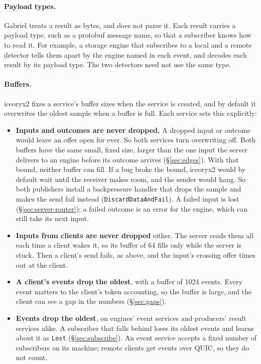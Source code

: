 \documentclass[11pt]{article}
\newcommand{\code}[1]{\texttt{#1}}
\begin{document}
\paragraph{Payload types.} Gabriel treats a result as bytes, and does not
parse it. Each result carries a payload type, such as a protobuf message name,
so that a subscriber knows how to read it. For example, a storage engine that
subscribes to a local and a remote detector tells them apart by the engine
named in each event, and decodes each result by its payload type. The two
detectors need not use the same type.

\paragraph{Buffers.} iceoryx2 fixes a service's buffer sizes when the service
is created, and by default it overwrites the oldest sample when a buffer is
full. Each service sets this explicitly:
\begin{itemize}[nosep]
  \item \textbf{Inputs and outcomes are never dropped.} A dropped input or
        outcome would leave an offer open for ever. So both services turn
        overwriting off. Both buffers have the same small, fixed size, larger
        than the one input the server delivers to an engine before its
        outcome arrives (\S\ref{sec:edges}). With that bound, neither buffer
        can fill. If a bug broke the bound, iceoryx2 would by default wait
        until the receiver makes room, and the sender would hang. So both
        publishers install a backpressure handler that drops the sample and
        makes the send fail instead (\code{DiscardDataAndFail}). A failed
        input is lost (\S\ref{sec:server-router}); a failed outcome is an
        error for the engine, which can still take its next input.
  \item \textbf{Inputs from clients are never dropped} either. The server
        reads them all each time a client wakes it, so its buffer of 64 fills
        only while the server is stuck. Then a client's send fails, as above,
        and the input's crossing offer times out at the client.
  \item \textbf{A client's events drop the oldest}, with a buffer of 1024
        events. Every event matters to the client's token accounting, so the
        buffer is large, and the client can see a gap in the numbers
        (\S\ref{sec:gaps}).
  \item \textbf{Events drop the oldest}, on engines' event services and
        producers' result services alike. A subscriber that falls behind loses
        its oldest events and learns about it as \code{Lost}
        (\S\ref{sec:subscribe}). An event service accepts a fixed number of
        subscribers on its machine; remote clients get events over QUIC, so
        they do not count.
\end{itemize}
\end{document}
